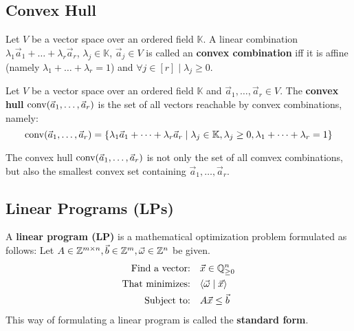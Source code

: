 \subsection{Convex Hull}
\begin{definition}
    \label{def:convex_hull}
    Let $V$ be a vector space over an ordered field $\mathbb{K}$. A linear combination $\lambda_1 \vec a_1 + \dots + \lambda_r \vec a_r$, $\lambda_j \in \mathbb{K}$, $\vec a_j \in V$ is called an \textbf{convex combination} iff it is affine (namely $\lambda_1 + \dots + \lambda_r = 1$) and $\forall j\in[r]\mid \lambda_j \geq 0$.
\end{definition}
\begin{definition}
    Let $V$ be a vector space over an ordered field $\mathbb{K}$ and $\vec a_1, \dots, \vec a_r \in V$. The \textbf{convex hull} $\operatorname{conv}(\vec a_1, \dots, \vec a_r)$ is the set of all vectors reachable by convex combinations, namely:
    $$\operatorname{conv}(\vec a_1, \dots, \vec a_r) = \{\lambda_1 \vec a_1 + \dots + \lambda_r \vec a_r \mid \lambda_j \in \mathbb{K}, \lambda_j \geq 0, \lambda_1 + \dots + \lambda_r = 1\}$$
\end{definition}
\begin{observation}
    The convex hull $\operatorname{conv}(\vec a_1, \dots, \vec a_r)$ is not only the set of all comvex combinations, but also the smallest convex set containing $\vec a_1, \dots, \vec a_r$.
\end{observation}

\subsection{Linear Programs (LPs)}
\begin{definition}
    A \textbf{linear program (LP)} is a mathematical optimization problem formulated as follows: Let $A\in\mathbb{Z}^{m\times n}, \vec b \in \mathbb{Z}^m, \vec\omega \in \mathbb{Z}^n$ be given.
    \begin{align*}
        \text{Find a vector:} & \quad \vec x \in \mathbb{Q}^n_{\geq 0} \\
        \text{That minimizes:} & \quad \langle \vec \omega \mid \vec x \rangle\\
        \text{Subject to:} & \quad A\vec x \leq \vec b \\
    \end{align*}
    This way of formulating a linear program is called the \textbf{standard form}.
\end{definition}

